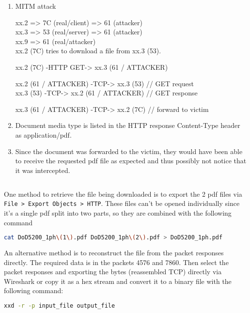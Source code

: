 \documentclass[12pt]{exam}
\begin{document}
\begin{enumerate}[label=\alph*)]
    \item
        MITM attack

        xx.2 => 7C (real/client) => 61 (attacker)\\
        xx.3 => 53 (real/server) => 61 (attacker)\\
        xx.9 => 61 (real/attacker)\\

        xx.2 (7C) tries to download a file from xx.3 (53).

        xx.2 (7C) -HTTP GET-> xx.3 (61 / ATTACKER)

        xx.2 (61 / ATTACKER) -TCP-> xx.3 (53) // GET request\\
        xx.3 (53)            -TCP-> xx.2 (61 / ATTACKER) // GET response

        xx.3 (61 / ATTACKER) -TCP-> xx.2 (7C) // forward to victim
    \item Document media type is listed in the HTTP response Content-Type header
    as application/pdf.
    \item Since the document was forwarded to the victim, they would have been
    able to receive the requested pdf file as expected and thus possibly not
    notice that it was intercepted.
\end{enumerate}

\subsection{}

One method to retrieve the file being downloaded is to export the 2 pdf files
via \lstinline{File > Export Objects > HTTP}.  These files can't be opened
individually since it's a single pdf split into two parts, so they are combined
with the following command

\begin{lstlisting}[language=bash]
    cat DoD5200_1ph\(1\).pdf DoD5200_1ph\(2\).pdf > DoD5200_1ph.pdf
\end{lstlisting}

An alternative method is to reconstruct the file from the packet responses
directly.  The required data is in the packets 4576 and 7860.  Then select the
packet responses and exporting the bytes (reassembled TCP) directly via
Wireshark or copy it as a hex stream and convert it to a binary file with the
following command:

\begin{lstlisting}[language=bash]
    xxd -r -p input_file output_file
\end{lstlisting}
\end{document}
